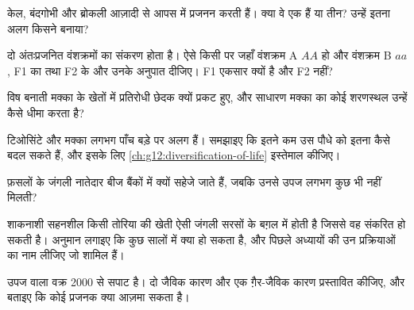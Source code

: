 \begin{exercise}[$\star\star$]\label{exo:g12:domesticated-plants:7}
केल, बंदगोभी और ब्रोकली आज़ादी से आपस में प्रजनन करती हैं। क्या वे एक 
हैं या तीन? उन्हें इतना अलग किसने बनाया?
\end{exercise}

\begin{exercise}[$\star\star$]\label{exo:g12:domesticated-plants:8}
दो अंतःप्रजनित वंशक्रमों का संकरण होता है। ऐसे किसी  पर जहाँ वंशक्रम A
$AA$ हो और वंशक्रम B $aa$, F1 का  तथा F2 के  और उनके
अनुपात दीजिए। F1 एकसार क्यों है और F2 नहीं?
\end{exercise}

\begin{exercise}[$\star\star$]\label{exo:g12:domesticated-plants:9}
विष बनाती मक्का के खेतों में प्रतिरोधी छेदक क्यों प्रकट हुए, और साधारण
मक्का का कोई शरणस्थल उन्हें कैसे धीमा करता है?
\end{exercise}

\begin{exercise}[$\star\star$]\label{exo:g12:domesticated-plants:10}
टिओसिंटे और मक्का लगभग पाँच बड़े  पर अलग हैं। समझाइए कि इतने कम  उस
पौधे को इतना कैसे बदल सकते हैं, और इसके लिए
\cref{ch:g12:diversification-of-life} इस्तेमाल कीजिए।
\end{exercise}

\begin{exercise}[$\star\star$]\label{exo:g12:domesticated-plants:11}
फ़सलों के जंगली नातेदार बीज बैंकों में क्यों सहेजे जाते हैं, जबकि उनसे उपज
लगभग कुछ भी नहीं मिलती?
\end{exercise}

\begin{exercise}[$\star\star\star$]\label{exo:g12:domesticated-plants:12}
शाकनाशी सहनशील किसी तोरिया की खेती ऐसी जंगली सरसों के बग़ल में होती है
जिससे वह संकरित हो सकती है। अनुमान लगाइए कि कुछ सालों में क्या हो सकता है,
और पिछले अध्यायों की उन प्रक्रियाओं का नाम लीजिए जो शामिल हैं।
\end{exercise}

\begin{exercise}[$\star\star\star$]\label{exo:g12:domesticated-plants:13}
उपज वाला वक्र 2000 से सपाट है। दो जैविक कारण और एक ग़ैर-जैविक कारण
प्रस्तावित कीजिए, और बताइए कि कोई प्रजनक क्या आज़मा सकता है।
\end{exercise}

